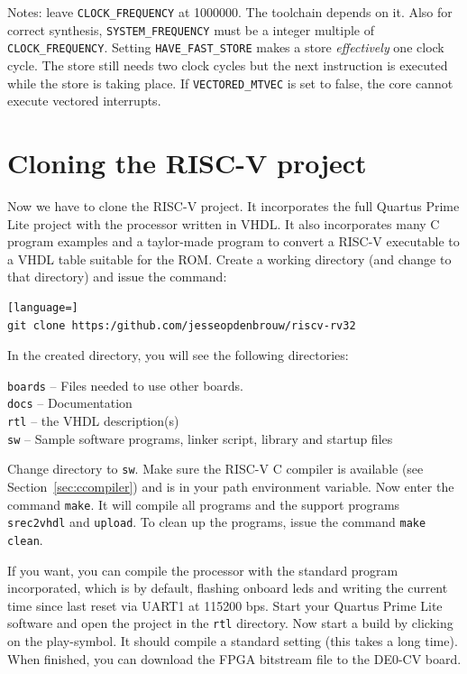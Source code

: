 \documentclass[12pt]{article}
\begin{document}
Notes: leave \lstinline|CLOCK_FREQUENCY| at 1000000. The toolchain depends on it. Also for correct synthesis, \lstinline|SYSTEM_FREQUENCY| must be a integer multiple of \lstinline|CLOCK_FREQUENCY|.
Setting \lstinline|HAVE_FAST_STORE| makes a store \emph{effectively} one clock cycle. The store still needs two clock cycles but the next instruction is executed while the store is taking place. If \lstinline|VECTORED_MTVEC| is set to false, the core cannot execute vectored interrupts.

\section{Cloning the RISC-V project}
\label{sec:cloning}
Now we have to clone the RISC-V project. It incorporates the full Quartus Prime Lite project with the processor written in VHDL. It also incorporates many C program examples and a taylor-made program to convert a RISC-V executable to a VHDL table suitable for the ROM. Create a working directory (and change to that directory) and issue the command:

\begin{lstlisting}[language=]
git clone https:/github.com/jesseopdenbrouw/riscv-rv32
\end{lstlisting}

In the created directory, you will see the following directories:

\lstinline|boards| -- Files needed to use other boards.\\
\lstinline|docs| -- Documentation \\
\lstinline|rtl| -- the VHDL description(s)\\
\lstinline|sw| -- Sample software programs, linker script, library and startup files

Change directory to \lstinline|sw|. Make sure the RISC-V C compiler is available (see Section~\ref{sec:ccompiler}) and is in your path environment variable. Now enter the command \lstinline|make|. It will compile all programs and the support programs \lstinline|srec2vhdl| and \lstinline|upload|. To clean up the programs, issue the command \lstinline|make clean|.

If you want, you can compile the processor with the standard program incorporated, which is by default, flashing onboard leds and writing the current time since last reset via UART1 at 115200 bps. Start your Quartus Prime Lite software and open the project in the \lstinline|rtl| directory. Now start a build by clicking on the play-symbol. It should compile a standard setting (this takes a long time). When finished, you can download the FPGA bitstream file to the DE0-CV board.
\end{document}
